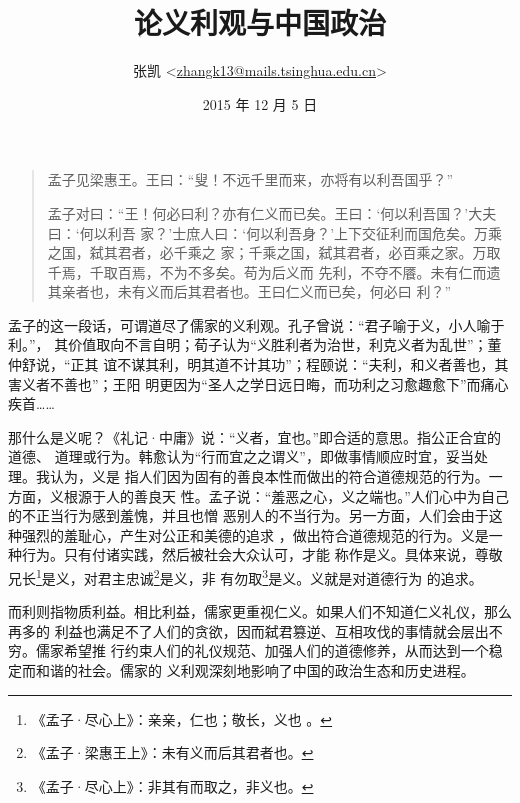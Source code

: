 

\title{\FZLiuKai 论义利观与中国政治}
\author{{\FZLiuKai 张凯}
<\href{mailto:zhangk13@mails.tsinghua.edu.cn}{zhangk13@mails.tsinghua.edu.cn}>}
\date{2015 年 12 月 5 日}


\maketitle
\tableofcontents

\section*{}

\begin{quotation}

孟子见梁惠王。王曰：“叟！不远千里而来，亦将有以利吾国乎？”

孟子对曰：“王！何必曰利？亦有仁义而已矣。王曰：‘何以利吾国？’大夫曰：‘何以利吾
家？’士庶人曰：‘何以利吾身？’上下交征利而国危矣。万乘之国，弑其君者，必千乘之
家；千乘之国，弑其君者，必百乘之家。万取千焉，千取百焉，不为不多矣。苟为后义而
先利，不夺不餍。未有仁而遗其亲者也，未有义而后其君者也。王曰仁义而已矣，何必曰
利？”\parencite{wjwk-mz-lhws}

\end{quotation}

孟子的这一段话，可谓道尽了儒家的义利观。孔子曾说：“君子喻于义，小人喻于利。”，
其价值取向不言自明；荀子认为“义胜利者为治世，利克义者为乱世”；董仲舒说，“正其
谊不谋其利，明其道不计其功”；程颐说：“夫利，和义者善也，其害义者不善也”；王阳
明更因为“圣人之学日远日晦，而功利之习愈趣愈下”而痛心疾首……

那什么是义呢？《礼记·中庸》说：“义者，宜也。”即合适的意思。指公正合宜的道德、
道理或行为。韩愈认为“行而宜之之谓义”，即做事情顺应时宜，妥当处理。我认为，义是
指人们因为固有的善良本性而做出的符合道德规范的行为。一方面，义根源于人的善良天
性。孟子说：“羞恶之心，义之端也。”人们心中为自己的不正当行为感到羞愧，并且也憎
恶别人的不当行为。另一方面，人们会由于这种强烈的羞耻心，产生对公正和美德的追求
，做出符合道德规范的行为。义是一种行为。只有付诸实践，然后被社会大众认可，才能
称作是义。具体来说，尊敬兄长\footnote{《孟子·尽心上》：亲亲，仁也；敬长，义也
。}是义，对君主忠诚\footnote{《孟子·梁惠王上》：未有义而后其君者也。}是义，非
有勿取\footnote{《孟子·尽心上》：非其有而取之，非义也。}是义。义就是对道德行为
的追求。

而利则指物质利益。相比利益，儒家更重视仁义。如果人们不知道仁义礼仪，那么再多的
利益也满足不了人们的贪欲，因而弑君篡逆、互相攻伐的事情就会层出不穷。儒家希望推
行约束人们的礼仪规范、加强人们的道德修养，从而达到一个稳定而和谐的社会。儒家的
义利观深刻地影响了中国的政治生态和历史进程。

